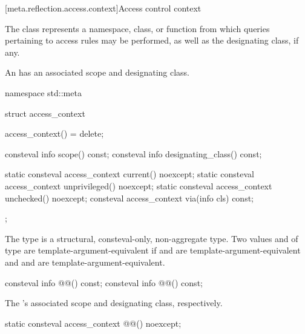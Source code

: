 [meta.reflection.access.context]{Access control context}

\pnum
The class 
represents a namespace, class, or function
from which queries pertaining to access rules may be performed,
as well as the designating class, if any.

%
\pnum
An  has an associated scope and designating class.

%
\begin{codeblock}
namespace std::meta {
  struct access_context {
    access_context() = delete;

    consteval info scope() const;
    consteval info designating_class() const;

    static consteval access_context current() noexcept;
    static consteval access_context unprivileged() noexcept;
    static consteval access_context unchecked() noexcept;
    consteval access_context via(info cls) const;
  };
}
\end{codeblock}

\pnum
The type  is a structural, consteval-only, non-aggregate type.
Two values  and  of type 
are template-argument-equivalent
if  and  are template-argument-equivalent
and  and 
are template-argument-equivalent.

\begin{itemdecl}
consteval info @@() const;
consteval info @@() const;
\end{itemdecl}

\begin{itemdescr}
\pnum
\returns
The 's associated scope
and designating class, respectively.
\end{itemdescr}

\begin{itemdecl}
static consteval access_context @@() noexcept;
\end{itemdecl}

